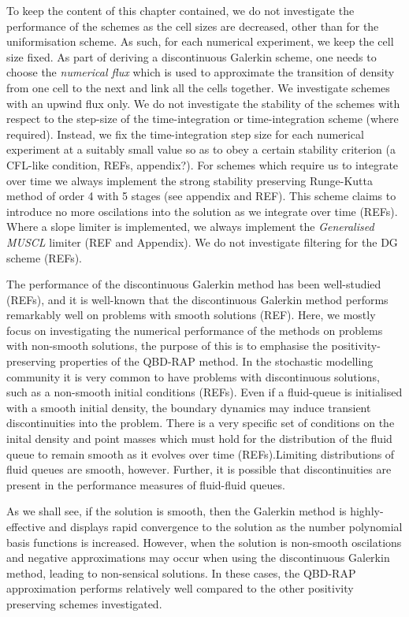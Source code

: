 To keep the content of this chapter contained, we do not investigate the performance of the schemes as the cell sizes are decreased, other than for the uniformisation scheme. As such, for each numerical experiment, we keep the cell size fixed. As part of deriving a discontinuous Galerkin scheme, one needs to choose the \emph{numerical flux} which is used to approximate the transition of density from one cell to the next and link all the cells together. We investigate schemes with an upwind flux only.
We do not investigate the stability of the schemes with respect to the step-size of the time-integration or time-integration scheme (where required). Instead, we fix the time-integration step size for each numerical experiment at a suitably small value so as to obey a certain stability criterion (a CFL-like condition, REFs, appendix?). For schemes which require us to integrate over time we always implement the strong stability preserving Runge-Kutta method of order 4 with 5 stages (see appendix and REF). This scheme claims to introduce no more oscilations into the solution as we integrate over time (REFs). Where a slope limiter is implemented, we always implement the \emph{Generalised MUSCL} limiter (REF and Appendix). We do not investigate filtering for the DG scheme (REFs).

The performance of the discontinuous Galerkin method has been well-studied (REFs), and it is well-known that the discontinuous Galerkin method performs remarkably well on problems with smooth solutions (REF). Here, we mostly focus on investigating the numerical performance of the methods on problems with non-smooth solutions, the purpose of this is to emphasise the positivity-preserving properties of the QBD-RAP method. In the stochastic modelling community it is very common to have problems with discontinuous solutions, such as a non-smooth initial conditions (REFs). Even if a fluid-queue is initialised with a smooth initial density, the boundary dynamics may induce transient discontinuities into the problem. There is a very specific set of conditions on the inital density and point masses which must hold for the distribution of the fluid queue to remain smooth as it evolves over time (REFs).Limiting distributions of fluid queues are smooth, however. Further, it is possible that discontinuities are present in the performance measures of fluid-fluid queues. 

As we shall see, if the solution is smooth, then the Galerkin method is highly-effective and displays rapid convergence to the solution as the number polynomial basis functions is increased. However, when the solution is non-smooth oscilations and negative approximations may occur when using the discontinuous Galerkin method, leading to non-sensical solutions. In these cases, the QBD-RAP approximation performs relatively well compared to the other positivity preserving schemes investigated.

